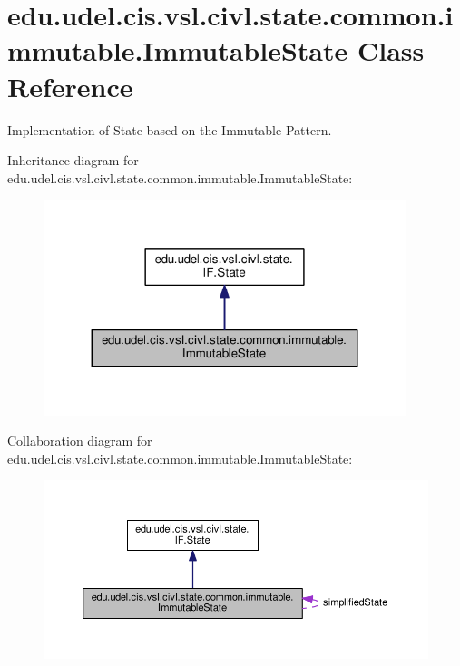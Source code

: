\hypertarget{classedu_1_1udel_1_1cis_1_1vsl_1_1civl_1_1state_1_1common_1_1immutable_1_1ImmutableState}{}\section{edu.\+udel.\+cis.\+vsl.\+civl.\+state.\+common.\+immutable.\+Immutable\+State Class Reference}
\label{classedu_1_1udel_1_1cis_1_1vsl_1_1civl_1_1state_1_1common_1_1immutable_1_1ImmutableState}


Implementation of State based on the Immutable Pattern.  




Inheritance diagram for edu.\+udel.\+cis.\+vsl.\+civl.\+state.\+common.\+immutable.\+Immutable\+State\+:
\nopagebreak
\begin{figure}[H]
\begin{center}
\leavevmode
\includegraphics[width=299pt]{classedu_1_1udel_1_1cis_1_1vsl_1_1civl_1_1state_1_1common_1_1immutable_1_1ImmutableState__inherit__graph}
\end{center}
\end{figure}


Collaboration diagram for edu.\+udel.\+cis.\+vsl.\+civl.\+state.\+common.\+immutable.\+Immutable\+State\+:
\nopagebreak
\begin{figure}[H]
\begin{center}
\leavevmode
\includegraphics[width=350pt]{classedu_1_1udel_1_1cis_1_1vsl_1_1civl_1_1state_1_1common_1_1immutable_1_1ImmutableState__coll__graph}
\end{center}
\end{figure}
